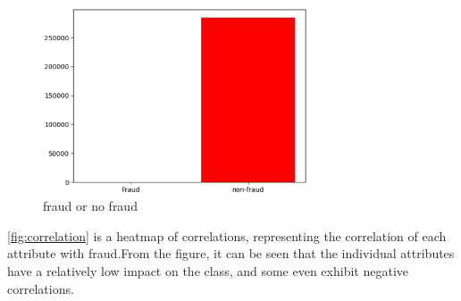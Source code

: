 \begin{figure}[H]
	\centering
	\includegraphics[width=0.7\textwidth]{figures/fraud.eps}
	\caption{fraud or no fraud}
	\label{fig:fraud data}
\end{figure}

\cref{fig:correlation} is a heatmap of correlations, representing the correlation of each attribute with fraud.From the figure, it can be seen that the individual attributes have a relatively low impact on the class, and some even exhibit negative correlations.

